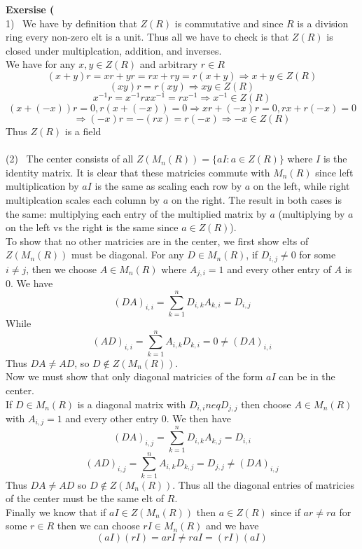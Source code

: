 \documentclass[12pt]{article}
\newenvironment{ques}[1]{\textbf{Exersise #1}\vspace{1 mm}\\ }{\bigskip}
\theoremstyle{definition}
\begin{document}
\begin{ques}{3.5}
	(1) \ We have by definition that $Z(R)$ is commutative and since $R$ is a
	division ring every non-zero
	elt is a unit. Thus all we have to check is that $Z(R)$ is closed under
	multiplcation, addition, and inverses.\\
	We have for any $x, y \in Z(R)$ and arbitrary $r \in R$
	$$(x + y)r = xr + yr = rx + ry = r(x + y) \Rightarrow x + y \in Z(R)$$
	$$(xy)r = r(xy) \Rightarrow xy \in Z(R)$$
	$$x^{-1}r = x^{-1}rxx^{-1} = rx^{-1}\Rightarrow x^{-1} \in Z(R)$$
	$$(x + (-x))r = 0, r(x + (-x)) = 0 \Rightarrow xr + (-x)r = 0, rx + r(-x) =
	0  $$
	$$\Rightarrow (-x)r = -(rx) = r(-x) \Rightarrow -x \in Z(R)$$
	Thus $Z(R)$ is a field\\
	\\
	(2) \ The center consists of all $Z(M_n(R)) = \{aI : a \in Z(R)\}$ where $I$ is the
	identity matrix. It is clear that these matricies commute with $M_n(R)$
	since left multiplication by $aI$ is the same as scaling each row by $a$ on
	the left, while right multiplcation scales each column by $a$ on the right.
	The result in both cases is the same: multiplying each entry of the multiplied
	matrix by $a$ (multiplying by $a$ on the left vs the right is the same since $a
	\in Z(R)$). \\
	To show that no other matricies are in the center, we first show elts of
	$Z(M_n(R))$ must be diagonal. For any $D \in M_n(R)$, if $D_{i,j} \neq 0$
	for some $i \neq j$, then we choose $A \in M_n(R)$ where $A_{j,i} = 1$ and
	every other entry of $A$ is $0$. We have
	$$(DA)_{i,i} = \sum_{k=1}^n D_{i,k}A_{k,i} = D_{i,j}$$
	While
	$$(AD)_{i,i} = \sum_{k=1}^n A_{i,k}D_{k,i} = 0 \neq (DA)_{i,i}$$
	Thus $DA \neq AD$, so $D \notin Z(M_n(R))$.\\
	Now we must show that only diagonal matricies of the form $aI$ can be in
	the center.\\
	If $D \in M_n(R)$ is a diagonal matrix with $D_{i,i} neq D_{j,j}$ then
	choose $A \in M_n(R)$ with $A_{i,j} = 1$ and every other entry $0$.
	We then have 
	$$(DA)_{i,j} = \sum_{k=1}^n D_{i,k}A_{k,j} = D_{i,i}$$
	$$(AD)_{i,j} = \sum_{k=1}^n A_{i,k}D_{k,j} = D_{j,j} \neq (DA)_{i,j}$$
	Thus $DA \neq AD$ so $D \notin Z(M_n(R))$. Thus all the diagonal entries of
	matricies of the center must be the same elt of $R$.\\
	Finally we know that if $aI \in Z(M_n(R))$ then $a \in Z(R)$ since if $ar
	\neq ra$ for some $r \in R$ then we can choose $rI \in M_n(R)$ and we have 
	$$(aI)(rI) = arI \neq raI = (rI)(aI)$$

\end{ques}
\end{document}
